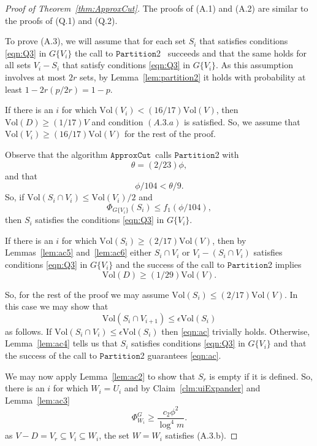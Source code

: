 \documentclass[11pt]{article}
\newcommand{\approxcut}{\ensuremath{\mathtt{ApproxCut}}}
\newcommand{\partition}{\ensuremath{\mathtt{Partition}}}
\def\intersect{\cap}
\def\intersect{\cap}
\def\vol#1{\mathrm{Vol}\left(#1  \right)}
\def\conduc#1#2{\Phi_{#1}\left(#2  \right)}
\def\Conducin#1{\Phi^{G}_{#1}}
\begin{document}
\begin{proof}[Proof of Theorem~\ref{thm:ApproxCut}]
The proofs of (A.1) and (A.2) are similar to the proofs of (Q.1) and (Q.2).

To prove (A.3), 
  we will assume that for each set $S_{i}$ that satisfies conditions
  \eqref{eqn:Q3} in $G \{V_{i} \}$ the call to \partition2 \ succeeds
 and that the same holds for all sets $V_{i} - S_{i}$ that satisfy conditions
  \eqref{eqn:Q3} in $G \{V_{i} \}$.
As this assumption involves at most $2r$ sets, by Lemma~\ref{lem:partition2} 
  it holds with probability at least $1 - 2r (p/2r) = 1-p$.

If there is an $i$ for which $\vol{V_{i}} < (16/17) \vol{V}$,
  then $\vol{D} \geq (1/17) V$
  and condition $(A.3.a)$ is satisfied.
So, we assume that $\vol{V_{i}} \geq (16/17) \vol{V}$ for the rest of the proof.

Observe that the algorithm \approxcut \ calls \partition2 with 
\[
\theta = (2/23) \phi ,
\]
and  that 
\[
  \phi /104 < \theta /9.
\]
So, if $\vol{S_{i} \intersect V_{i}} \leq \vol{V_{i}}/2$ and
\[
  \conduc{G \{ V_{i} \}}{S_{i}} \leq f_{1} (\phi /104),
\]
then $S_{i}$ satisfies the conditions \eqref{eqn:Q3} in $G \{V_{i} \}$.

If there is an $i$ for which $\vol{S_{i}} \geq (2/17) \vol{V}$,
  then by Lemmas~\ref{lem:ac5} and~\ref{lem:ac6} either $S_{i} \intersect V_{i}$
  or $V_{i} - (S_{i} \intersect V_{i})$ satisfies conditions
  \eqref{eqn:Q3} in $G \{V_{i} \}$
 and the success of the call to \partition2 implies
\[
\vol{D} \geq (1/29) \vol{V}.
\]

So, for the rest of the proof we may assume
  $\vol{S_{i}} \leq (2/17) \vol{V}$.
In this case we may show that
\begin{equation}\label{eqn:ac}
  \vol{S_{i} \intersect V_{i+1}} \leq \epsilon \vol{S_{i}}
\end{equation}
as follows.
If $\vol{S_{i} \intersect V_{i}} \leq \epsilon \vol{S_{i}}$ then
  \eqref{eqn:ac} trivially holds.
Otherwise, Lemma~\ref{lem:ac4} tells us that $S_{i}$
  satisfies conditions \eqref{eqn:Q3} in $G \{V_{i} \}$ and
  that the success of the call to \partition2 guarantees \eqref{eqn:ac}.

We may now apply Lemma~\ref{lem:ac2} to show that $S_{r}$ is empty if it
  is defined. 
So, there is an $i$ for which $W_{i} = U_{i}$ and by Claim~\ref{clm:uiExpander}  and
  Lemma~\ref{lem:ac3} 
\[
  \Conducin{W_{i}} \geq \frac{c_{2} \phi^{2}}{\log^{4} m}.
\]
as $V-D = V_{r} \subseteq V_{i} \subseteq W_{i}$, the set $W = W_{i}$
  satisfies (A.3.b).
\end{proof}
\end{document}

